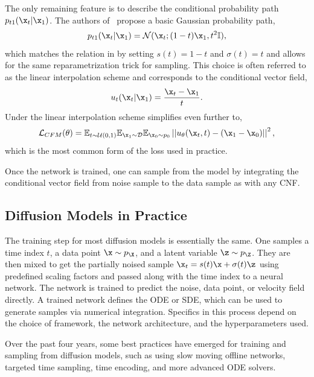 The only remaining feature is to describe the conditional probability path $p_{t1}(\x_t | \x_1)$.
The authors of~\cite{FlowStraightFast} propose a basic Gaussian probability path,
\begin{equation}
    \label{eq:conditional_gaussian}
    p_{t1}(\x_t | \x_1) = \mathcal{N}(\x_t; (1 - t)\x_1, t^2\mathbb{I}),
\end{equation}
which matches the relation in  by setting $s(t) = 1 - t$ and $\sigma(t) = t$ and allows for the same reparametrization trick for sampling.
This choice is often referred to as the linear interpolation scheme and corresponds to the conditional vector field,
\begin{equation}
    \label{eq:conditional_gaussian_field}
    u_t(\x_t | \x_1) = \frac{\x_t-\x_1}{t}.
\end{equation}
Under the linear interpolation scheme  simplifies even further to,
\begin{equation}
    \label{eq:linear_cfm_loss}
    \mathcal{L}_{CFM}(\theta) =
    \mathbb{E}_{t \sim \timeone}
    \mathbb{E}_{\x_1 \sim \mathcal{D}}
    \mathbb{E}_{\x_0 \sim p_0}
    \left|\left|u_\theta(\x_t, t) - (\x_1 - \x_0)\right|\right|^2,
\end{equation}
which is the most common form of the loss used in practice.

Once the network is trained, one can sample from the model by integrating the conditional vector field from noise sample to the data sample as with any CNF.

\subsection{Diffusion Models in Practice}

The training step for most diffusion models is essentially the same.
One samples a time index $t$, a data point $\x \sim p_\X$, and a latent variable $\z \sim p_\Z$.
They are then mixed to get the partially noised sample $\x_t = s(t)\x + \sigma(t)\z$ using predefined scaling factors and passed along with the time index to a neural network.
The network is trained to predict the noise, data point, or velocity field directly.
A trained network defines the ODE or SDE, which can be used to generate samples via numerical integration.
Specifics in this process depend on the choice of framework, the network architecture, and the hyperparameters used.

Over the past four years, some best practices have emerged for training and sampling from diffusion models, such as using slow moving offline networks, targeted time sampling, time encoding, and more advanced ODE solvers.

